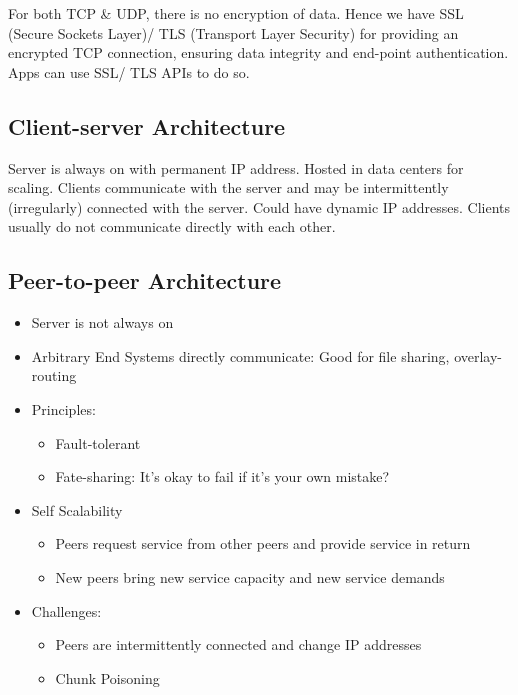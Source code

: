 \documentclass[a4paper]{article}
\begin{document}
For both TCP \& UDP, there is no encryption of data. Hence we have SSL (Secure Sockets Layer)/ TLS (Transport Layer Security) for providing an encrypted TCP connection, ensuring data integrity and end-point authentication. Apps can use SSL/ TLS APIs to do so.

\subsection{Client-server Architecture}
Server is always on with permanent IP address. Hosted in data centers for scaling. Clients communicate with the server and may be intermittently (irregularly) connected with the server. Could have dynamic IP addresses. Clients usually do not communicate directly with each other.

\subsection{Peer-to-peer Architecture}
\begin{itemize}
    \item Server is not always on
    \item Arbitrary End Systems directly communicate: Good for file sharing, overlay-routing
    \item Principles:
    \begin{itemize}[label=$\circ$]
        \item Fault-tolerant
        \item Fate-sharing: It's okay to fail if it's your own mistake?
    \end{itemize}
    \item Self Scalability
    \begin{itemize}[label=$\circ$]
        \item Peers request service from other peers and provide service in return
        \item New peers bring new service capacity and new service demands
    \end{itemize}
    \item Challenges:
    \begin{itemize}[label=$\circ$]
        \item Peers are intermittently connected and change IP addresses
        \item Chunk Poisoning
    \end{itemize}
\end{itemize}
\end{document}
